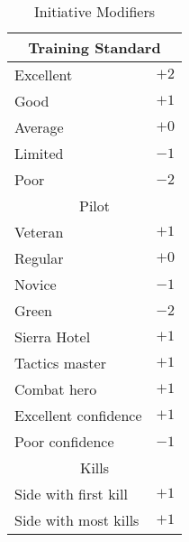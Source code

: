 \begin{table}
\centering
\caption{Initiative Modifiers}
\medskip
\begin{tabular}{ll}
\hline
\multicolumn{2}{c}{Training Standard}\\
\hline
Excellent               &$+2$\\
Good                    &$+1$\\
Average                 &$+0$\\
Limited                 &$-1$\\
Poor                    &$-2$\\
\hline
\multicolumn{2}{c}{Pilot}\\
\hline
Veteran                 &$+1$\\
Regular                 &$+0$\\
Novice                  &$-1$\\
Green                   &$-2$\\
Sierra Hotel            &$+1$\\
Tactics master          &$+1$\\
Combat hero             &$+1$\\
Excellent confidence    &$+1$\\
Poor confidence         &$-1$\\
\hline
\multicolumn{2}{c}{Kills}\\
\hline
Side with first kill    &$+1$\\
Side with most kills    &$+1$\\
\hline
\end{tabular}
\end{table}
